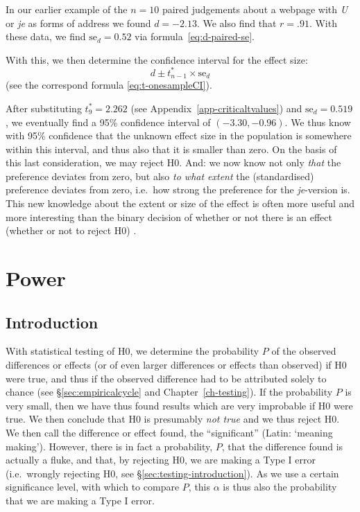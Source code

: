 \documentclass[
]{book}
\begin{document}
In
our earlier example of the \(n=10\) paired judgements about a webpage
with \emph{U} or \emph{je} as forms of address we found \(d=-2.13\). We also find
that \(r=.91\). With these data, we find \(\textrm{se}_d = 0.52\) via
formula~\eqref{eq:d-paired-se}.

With this, we then determine the confidence interval for the
effect size:
\begin{equation}
   \label{eq:d-paired-CI}
    d \pm t^*_{n-1} \times \textrm{se}_d 
\end{equation}
(see the correspond
formula \eqref{eq:t-onesampleCI}).

After substituting \(t^*_9=2.262\) (see Appendix~\ref{app-criticaltvalues}) and
\(\textrm{se}_d = 0.519\), we eventually find a 95\% confidence interval of \((-3.30,-0.96)\).
We thus
know with 95\% confidence that the unknown effect size in the population
is somewhere within this interval, and thus also that it is smaller than
zero. On the basis of this last consideration, we may reject H0.
And: we now know not only \emph{that} the preference deviates from zero, but
also \emph{to what extent} the (standardised) preference deviates from zero,
i.e.~how strong the preference for the \emph{je}-version is. This new knowledge
about the extent or size of the effect is often more useful and more interesting
than the binary decision of whether or not there is an effect (whether or not
to reject H0) \citep{Cumm12}.

\hypertarget{ch-power}{%
\chapter{Power}\label{ch-power}}

\hypertarget{sec:power-introduction}{%
\section{Introduction}\label{sec:power-introduction}}

With statistical testing of H0, we determine the probability \(P\) of the
observed differences or effects (or of even larger differences or effects
than observed) if H0 were true, and thus if
the observed difference had to be attributed solely to chance
(see §\ref{sec:empiricalcycle} and
Chapter~\ref{ch-testing}). If the probability \(P\) is very small, then
we have thus found results which are very improbable if H0 were true.
We then conclude that H0 is presumably \emph{not true} and we thus reject
H0. We then call the difference or effect found, the ``significant''
(Latin: `meaning making'). However, there is in fact a probability,
\(P\), that the difference found is actually a fluke, and that, by rejecting
H0, we are making a Type I error (i.e.~wrongly rejecting H0,
see
§\ref{sec:testing-introduction}). As we use a certain
significance level, with which to compare \(P\), this \(\alpha\)
is thus also the probability that we are making a Type I error.
\end{document}
